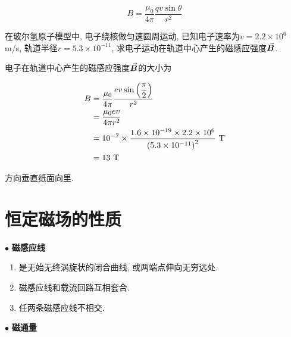 \begin{equation*}
	B = \dfrac{\mu_0}{4 \pi} \dfrac{q v \sin\theta}{r^2}
\end{equation*}

\begin{example}
	在玻尔氢原子模型中, 电子绕核做匀速圆周运动, 已知电子速率为$v = 2.2 \times 10^6$ m/s, 轨道半径$r = 5.3 \times 10^{-11}$, 求电子运动在轨道中心产生的磁感应强度$\va*{B}$. 
	
	\begin{solution}
		
		电子在轨道中心产生的磁感应强度$\va*{B}$的大小为
		
		\begin{align*}
			B &= \dfrac{\mu_0}{4 \pi} \dfrac{e v \sin\qty(\dfrac{\pi}{2})}{r^2} \\ 
			&= \dfrac{\mu_0 e v}{4 \pi r^2} \\
			&= 10^{-7} \times \dfrac{1.6 \times 10^{-19} \times 2.2 \times 10^6}{\qty(5.3 \times 10^{-11})^2} \textrm{~T} \\
			&= 13 \textrm{~T}
		\end{align*}
		
		方向垂直纸面向里. 
		
	\end{solution}
	
\end{example}

\section{恒定磁场的性质}\label{8.3}

$\bullet$ \textbf{磁感应线}

\begin{enumerate}[itemindent=1em]
	
	\item 是无始无终涡旋状的闭合曲线, 或两端点伸向无穷远处. 
	
	\item 磁感应线和载流回路互相套合. 
	
	\item 任两条磁感应线不相交. 
	
\end{enumerate}

$\bullet$ \textbf{磁通量}

